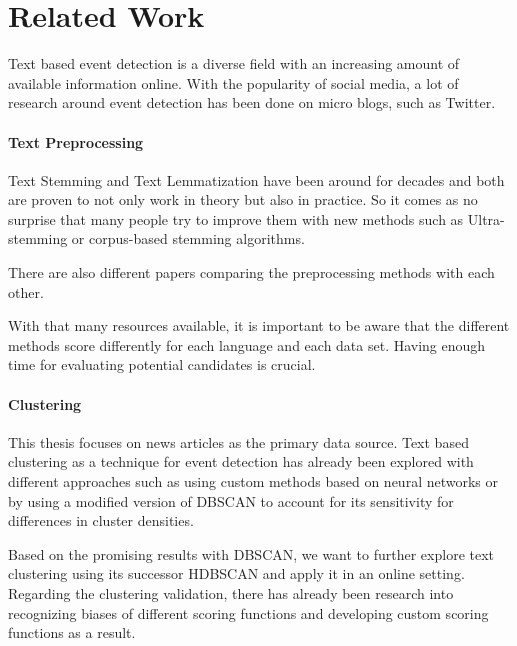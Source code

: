 \section{Related Work}
\label{sec:2_related_work}

Text based event detection is a diverse field with an increasing amount of available information online.
With the popularity of social media, a lot of research around event detection
has been done on micro blogs\cite{microblog_clustering}, such as Twitter\cite{twitter_survey, social_media_survey}.

\paragraph{Text Preprocessing}
Text Stemming and Text Lemmatization have been around for decades and both are proven to not only work
in theory but also in practice.
So it comes as no surprise that many people try to improve them with new methods such as
Ultra-stemming\cite{UltraStemming} or corpus-based stemming algorithms\cite{CorpusBasedStemming}.

There are also different papers comparing the preprocessing methods
with each other\cite{Suryanarayana2015SteppingTA, BounabiMS17}.

With that many resources available, it is important to be aware that the different methods
score differently for each language and each data set.
Having enough time for evaluating potential candidates is crucial.

\paragraph{Clustering}
This thesis focuses on news articles as the primary data source.
Text based \gls{clustering} as a technique for event detection
has already been explored with different approaches such as
using custom methods based on neural networks\cite{text_clustering_topic_detection}
or by using a modified version of DBSCAN
to account for its sensitivity for differences in cluster densities\cite{dbscan_martingale}.

Based on the promising results with DBSCAN, we want to further explore text clustering
using its successor HDBSCAN\cite{McInnes2017} and apply it in an online setting.
Regarding the clustering validation, there has already been research into recognizing biases
of different scoring functions\cite{Wu:2009:ARM:1557019.1557115}
and developing custom scoring functions as a result\cite{gates2017comparing}.
